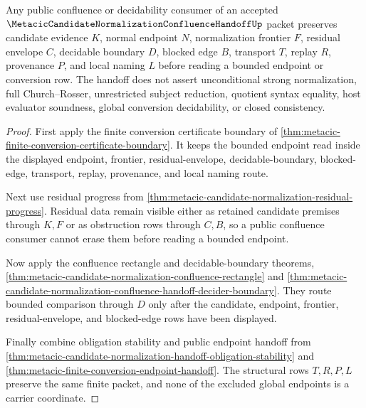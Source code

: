 \begin{theorem}
\label{thm:metacic-candidate-normalization-confluence-handoff-public}
Any public confluence or decidability consumer of an accepted $\MetacicCandidateNormalizationConfluenceHandoffUp$ packet preserves candidate evidence $K$, normal endpoint $N$, normalization frontier $F$, residual envelope $C$, decidable boundary $D$, blocked edge $B$, transport $T$, replay $R$, provenance $P$, and local naming $L$ before reading a bounded endpoint or conversion row. The handoff does not assert unconditional strong normalization, full Church--Rosser, unrestricted subject reduction, quotient syntax equality, host evaluator soundness, global conversion decidability, or closed consistency.
\end{theorem}
\begin{proof}
First apply the finite conversion certificate boundary of \autoref{thm:metacic-finite-conversion-certificate-boundary}. It keeps the bounded endpoint read inside the displayed endpoint, frontier, residual-envelope, decidable-boundary, blocked-edge, transport, replay, provenance, and local naming route.

Next use residual progress from \autoref{thm:metacic-candidate-normalization-residual-progress}. Residual data remain visible either as retained candidate premises through $K,F$ or as obstruction rows through $C,B$, so a public confluence consumer cannot erase them before reading a bounded endpoint.

Now apply the confluence rectangle and decidable-boundary theorems, \autoref{thm:metacic-candidate-normalization-confluence-rectangle} and \autoref{thm:metacic-candidate-normalization-confluence-handoff-decider-boundary}. They route bounded comparison through $D$ only after the candidate, endpoint, frontier, residual-envelope, and blocked-edge rows have been displayed.

Finally combine obligation stability and public endpoint handoff from \autoref{thm:metacic-candidate-normalization-handoff-obligation-stability} and \autoref{thm:metacic-finite-conversion-endpoint-handoff}. The structural rows $T,R,P,L$ preserve the same finite packet, and none of the excluded global endpoints is a carrier coordinate.
\end{proof}


